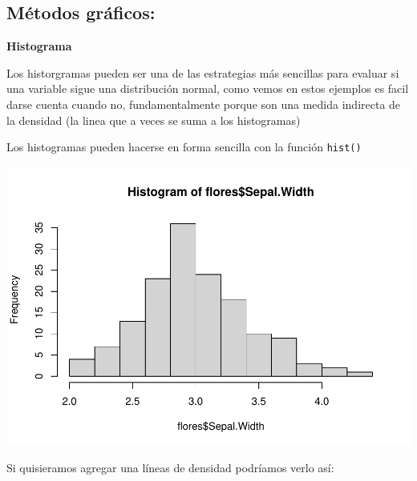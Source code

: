 \documentclass[
]{book}
\newenvironment{Shaded}{\begin{snugshade}}{\end{snugshade}}
\newcommand{\AttributeTok}[1]{\textcolor[rgb]{0.77,0.63,0.00}{#1}}
\newcommand{\ConstantTok}[1]{\textcolor[rgb]{0.00,0.00,0.00}{#1}}
\newcommand{\FunctionTok}[1]{\textcolor[rgb]{0.00,0.00,0.00}{#1}}
\newcommand{\NormalTok}[1]{#1}
\newcommand{\SpecialCharTok}[1]{\textcolor[rgb]{0.00,0.00,0.00}{#1}}
\begin{document}
\hypertarget{muxe9todos-gruxe1ficos}{%
\subsection{Métodos gráficos:}\label{muxe9todos-gruxe1ficos}}

\textbf{Histograma}

Los historgramas pueden ser una de las estrategias más sencillas para evaluar si una variable sigue una distribución normal, como vemos en estos ejemplos es facil darse cuenta cuando no, fundamentalmente porque son una medida indirecta de la densidad (la linea que a veces se suma a los histogramas)

Los histogramas pueden hacerse en forma sencilla con la función \texttt{hist()}

\begin{Shaded}
\end{Shaded}

\includegraphics{Esatadistica_en_R_files/figure-latex/unnamed-chunk-122-1.pdf}

Si quisieramos agregar una líneas de densidad podríamos verlo así:

\begin{Shaded}
\end{Shaded}
\end{document}
